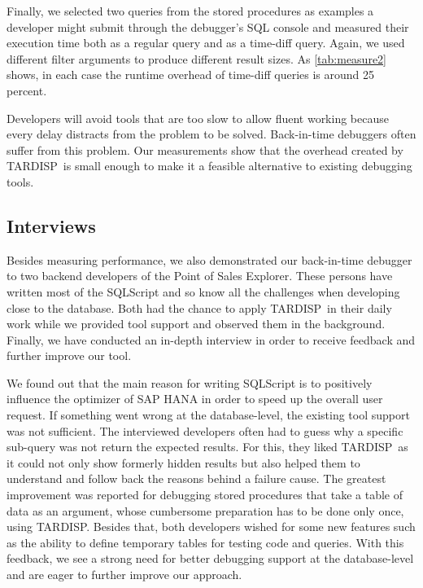 \documentclass[english,conference,final]{IEEEtran}
\newcommand{\tool}{TAR\-DISP}
\begin{document}
Finally, we selected two queries from the stored procedures as examples a developer might submit through the debugger's SQL console and measured their execution time both as a regular query and as a time-diff query.
Again, we used different filter arguments to produce different result sizes.
As \cref{tab:measure2} shows, in each case the runtime overhead of time-diff queries is around 25 percent.

Developers will avoid tools that are too slow to allow fluent working because every delay distracts from the problem to be solved. 
Back-in-time debuggers often suffer from this problem.
Our measurements show that the overhead created by \tool\ is small enough to make it a feasible alternative to existing debugging tools.

\subsection{Interviews}

Besides measuring performance, we also demonstrated our back-in-time debugger to two backend developers of the Point of Sales Explorer. 
These persons have written most of the SQLScript and so know all the challenges when developing close to the database. 
Both had the chance to apply \tool\ in their daily work while we provided tool support and observed them in the background. 
Finally, we have conducted an in-depth interview in order to receive feedback and further improve our tool.

We found out that the main reason for writing SQLScript is to positively influence the optimizer of SAP HANA in order to speed up the overall user request.
If something went wrong at the database-level, the existing tool support was not sufficient. 
The interviewed developers often had to guess why a specific sub-query was not return the expected results. 
For this, they liked \tool\ as it could not only show formerly hidden results but also helped them to understand and follow back the reasons behind a failure cause. 
The greatest improvement was reported for debugging stored procedures that take a table of data as an argument, whose cumbersome preparation has to be done only once, using \tool.
Besides that, both developers wished for some new features such as the ability to define temporary tables for testing code and queries.
With this feedback, we see a strong need for better debugging support at the database-level and are eager to further improve our approach.


\end{document}
